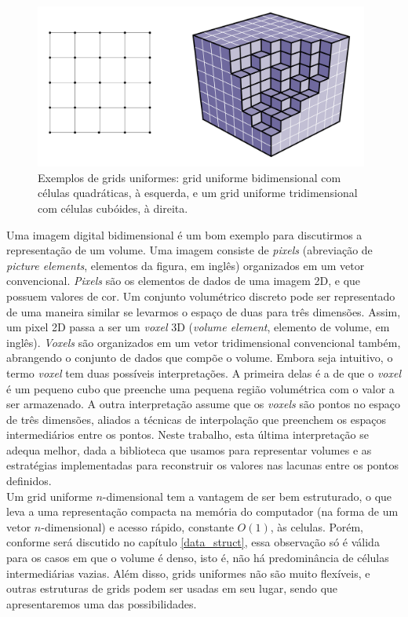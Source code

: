 \documentclass[12pt, a4paper, oneside]{book}
\begin{document}
\begin{figure}[!htb]
\center
\includegraphics[width=11cm]{grid_example}
\caption{Exemplos de grids uniformes: grid uniforme bidimensional com células quadráticas, à esquerda, e um grid uniforme tridimensional com células cubóides, à direita.}
\label{grid_ex}
\end{figure}

Uma imagem digital bidimensional é um bom exemplo para discutirmos a representação de um volume. Uma imagem consiste de {\it pixels} (abreviação de {\it picture elements}, elementos da figura, em inglês) organizados em um vetor convencional. {\it Pixels} são os elementos de dados de uma imagem 2D, e que possuem valores de cor.
Um conjunto volumétrico discreto pode ser representado de uma maneira similar se levarmos o espaço de duas para três dimensões. Assim, um pixel 2D passa a ser um {\it voxel} 3D ({\it volume element}, elemento de volume, em inglês). {\it Voxels} são organizados em um vetor tridimensional convencional também, abrangendo o conjunto de dados que compõe o volume.
Embora seja intuitivo, o termo {\it voxel} tem duas possíveis interpretações. A primeira delas é a de que o {\it voxel} é um pequeno cubo que preenche uma pequena região volumétrica com o valor a ser armazenado. A outra interpretação assume que os {\it voxels} são pontos no espaço de três dimensões, aliados a técnicas de interpolação que preenchem os espaços intermediários entre os pontos. Neste trabalho, esta última interpretação se adequa melhor, dada a biblioteca que usamos para representar volumes e as estratégias implementadas para reconstruir os valores nas lacunas entre os pontos definidos. \\

Um grid uniforme $n$-dimensional tem a vantagem de ser bem estruturado, o que leva a uma representação compacta na memória do computador (na forma de um vetor $n$-dimensional) e acesso rápido, constante $O(1)$, às celulas. Porém, conforme será discutido no capítulo \ref{data_struct}, essa observação só é válida para os casos em que o volume é denso, isto é, não há predominância de células intermediárias vazias. Além disso, grids uniformes não são muito flexíveis, e outras estruturas de grids podem ser usadas em seu lugar, sendo que apresentaremos uma das possibilidades. \\
\end{document}
